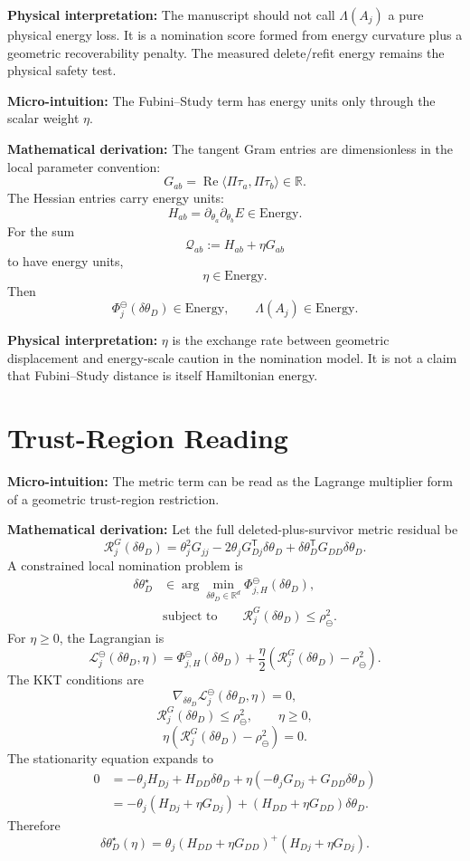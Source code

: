 \documentclass[10pt,twocolumn]{article}
\newcommand{\blocktitle}[1]{\vspace{2pt}\noindent\textbf{#1}\space}
\newcommand{\micro}[1]{\blocktitle{Micro-intuition:} #1}
\newcommand{\deriv}{\blocktitle{Mathematical derivation:}}
\newcommand{\phys}[1]{\blocktitle{Physical interpretation:} #1}
\begin{document}
\phys{The manuscript should not call \(\Lambda(A_j)\) a pure physical energy loss. It is a nomination score formed from energy curvature plus a geometric recoverability penalty. The measured delete/refit energy remains the physical safety test.}

\micro{The Fubini--Study term has energy units only through the scalar weight \(\eta\).}

\deriv
The tangent Gram entries are dimensionless in the local parameter convention:
\[
G_{ab}
=
\operatorname{Re}\langle \Pi\tau_a,\Pi\tau_b\rangle
\in\mathbb R.
\]
The Hessian entries carry energy units:
\[
H_{ab}
=
\partial_{\theta_a}\partial_{\theta_b}E
\in \mathrm{Energy}.
\]
For the sum
\[
\mathcal Q_{ab}:=H_{ab}+\eta G_{ab}
\]
to have energy units,
\[
\eta\in\mathrm{Energy}.
\]
Then
\[
\Phi_j^\ominus(\delta\theta_D)\in\mathrm{Energy},
\qquad
\Lambda(A_j)\in\mathrm{Energy}.
\]

\phys{\(\eta\) is the exchange rate between geometric displacement and energy-scale caution in the nomination model. It is not a claim that Fubini--Study distance is itself Hamiltonian energy.}

\section*{Trust-Region Reading}

\micro{The metric term can be read as the Lagrange multiplier form of a geometric trust-region restriction.}

\deriv
Let the full deleted-plus-survivor metric residual be
\[
\mathcal R_j^G(\delta\theta_D)
=
\theta_j^2G_{jj}
-2\theta_jG_{Dj}^{\mathsf T}\delta\theta_D
+
\delta\theta_D^{\mathsf T}G_{DD}\delta\theta_D .
\]
A constrained local nomination problem is
\[
\begin{aligned}
\delta\theta_D^\star
&\in
\arg\min_{\delta\theta_D\in\mathbb R^d}
\Phi_{j,H}^\ominus(\delta\theta_D),
\\
&\text{subject to}
\qquad
\mathcal R_j^G(\delta\theta_D)\le \rho_\ominus^2 .
\end{aligned}
\]
For \(\eta\ge0\), the Lagrangian is
\[
\mathcal L_j^\ominus(\delta\theta_D,\eta)
=
\Phi_{j,H}^\ominus(\delta\theta_D)
+
\frac{\eta}{2}
\left(
\mathcal R_j^G(\delta\theta_D)-\rho_\ominus^2
\right).
\]
The KKT conditions are
\[
\nabla_{\delta\theta_D}\mathcal L_j^\ominus(\delta\theta_D,\eta)=0,
\]
\[
\mathcal R_j^G(\delta\theta_D)\le\rho_\ominus^2,
\qquad
\eta\ge0,
\]
\[
\eta\left(\mathcal R_j^G(\delta\theta_D)-\rho_\ominus^2\right)=0.
\]
The stationarity equation expands to
\[
\begin{aligned}
0
&=
-\theta_jH_{Dj}
+
H_{DD}\delta\theta_D
+
\eta(-\theta_jG_{Dj}+G_{DD}\delta\theta_D)
\\
&=
-\theta_j(H_{Dj}+\eta G_{Dj})
+
(H_{DD}+\eta G_{DD})\delta\theta_D .
\end{aligned}
\]
Therefore
\[
\delta\theta_D^\star(\eta)
=
\theta_j(H_{DD}+\eta G_{DD})^+
(H_{Dj}+\eta G_{Dj}).
\]
\end{document}
